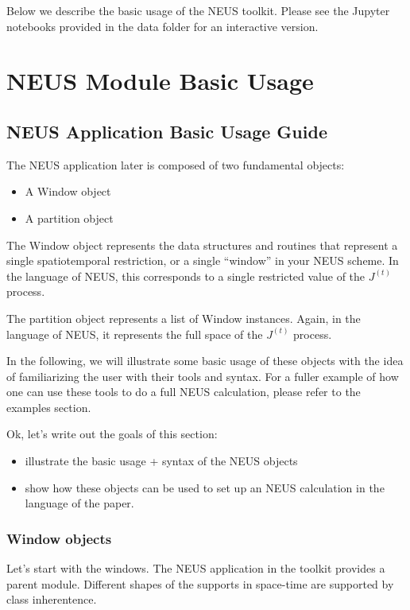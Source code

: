 \documentclass[letterpaper,10pt,english]{sphinxmanual}
\begin{document}
Below we describe the basic usage of the NEUS toolkit. Please see the Jupyter notebooks provided in the data folder for an interactive version.


\section{NEUS Module Basic Usage}
\label{neus/neus.doc:neus-module-basic-usage}

\subsection{NEUS Application Basic Usage Guide}
\label{neus/neus.doc:neus-application-basic-usage-guide}
The NEUS application later is composed of two fundamental objects:
\begin{itemize}
\item {} 
A Window object

\item {} 
A partition object

\end{itemize}

The Window object represents the data structures and routines that
represent a single spatiotemporal restriction, or a single ``window'' in
your NEUS scheme. In the language of NEUS, this corresponds to a single
restricted value of the \(J^{(t)}\) process.

The partition object represents a list of Window instances. Again, in
the language of NEUS, it represents the full space of the
\(J^{(t)}\) process.

In the following, we will illustrate some basic usage of these objects
with the idea of familiarizing the user with their tools and syntax. For
a fuller example of how one can use these tools to do a full NEUS
calculation, please refer to the examples section.

Ok, let's write out the goals of this section:
\begin{itemize}
\item {} 
illustrate the basic usage + syntax of the NEUS objects

\item {} 
show how these objects can be used to set up an NEUS calculation in
the language of the paper.

\end{itemize}


\subsubsection{Window objects}
\label{neus/neus.doc:window-objects}
Let's start with the windows. The NEUS application in the toolkit
provides a parent module. Different shapes of the supports in space-time
are supported by class inherentence.
\end{document}
